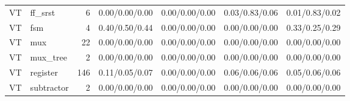 \begin{table}[t]
{\begin{tabular}{@{}llrcccc@{}}
VT & ff\_srst & 6 & 0.00/0.00/0.00 & 0.00/0.00/0.00 & 0.03/0.83/0.06 & 0.01/0.83/0.02 \\
VT & fsm & 4 & 0.40/0.50/0.44 & 0.00/0.00/0.00 & 0.00/0.00/0.00 & 0.33/0.25/0.29 \\
VT & mux & 22 & 0.00/0.00/0.00 & 0.00/0.00/0.00 & 0.00/0.00/0.00 & 0.00/0.00/0.00 \\
VT & mux\_tree & 2 & 0.00/0.00/0.00 & 0.00/0.00/0.00 & 0.00/0.00/0.00 & 0.00/0.00/0.00 \\
VT & register & 146 & 0.11/0.05/0.07 & 0.00/0.00/0.00 & 0.06/0.06/0.06 & 0.05/0.06/0.06 \\
VT & subtractor & 2 & 0.00/0.00/0.00 & 0.00/0.00/0.00 & 0.00/0.00/0.00 & 0.00/0.00/0.00 \\
\bottomrule
\end{tabular}}
\end{table}
